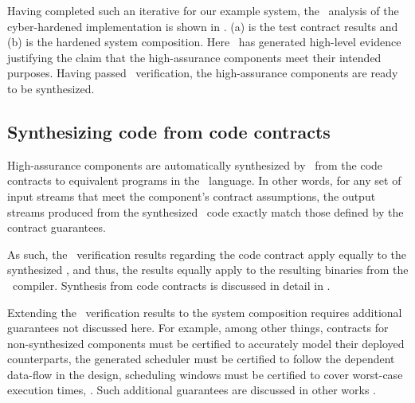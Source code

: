 Having completed such an iterative for our example system, 
the \agr\ analysis of the cyber-hardened implementation is shown in
.
(a) is the test contract results and (b) is the hardened system composition.
Here \agr\ has generated high-level
evidence justifying the claim that the high-assurance components meet their intended purposes.
Having passed \agr\ verification, the high-assurance components are ready to be
synthesized.


\subsection{Synthesizing code from code contracts}

High-assurance components are automatically synthesized by \splt\ from
the code contracts to equivalent programs in the \ckml\ language.  In
other words, for any set of input streams that meet the component's
contract assumptions, the output streams produced from the synthesized
\ckml\ code exactly match those defined by the contract guarantees.

As such, the \agr\ verification results regarding the code contract
apply equally to the synthesized \ckml, and thus, the results equally
apply to the resulting binaries from the \ckml\ compiler.  Synthesis
from code contracts is discussed in detail in .

Extending the \agr\ verification results to the system composition
requires additional guarantees not discussed here.  For
example, among other things, contracts for non-synthesized components
must be certified to accurately model their deployed counterparts, the
generated scheduler must be certified to follow the dependent
data-flow in the design, scheduling windows must be certified to cover
worst-case execution times, \etc.  Such additional guarantees are
discussed in other works \cite{gearcase2020, dcrypps2019,
  10.1007/978-3-030-89159-6_18, 10.1007/978-3-030-89159-6_17,
  sel4-2009, scheduled-agree, 9734792}.

